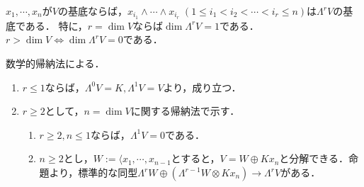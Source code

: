 \documentclass[uplatex,dvipdfmx]{jsreport}
\begin{document}
\begin{corollary}[外積代数の次元]\label{cor-basis-of-exterior-algebra}
    $x_1,\cdots,x_n$が$V$の基底ならば，$x_{i_1}\wedge\cdots\wedge x_{i_r}\;(1\le i_1<i_2<\cdots<i_r\le n)$は$\Lambda^rV$の基底である．
    特に，$r=\dim V$ならば$\dim\Lambda^rV=1$である．$r>\dim V\Leftrightarrow \dim\Lambda^rV=0$である．
\end{corollary}
\begin{Proof}
    数学的帰納法による．
    \begin{enumerate}
        \item $r\le 1$ならば，$\Lambda^0V=K,\Lambda^1V=V$より，成り立つ．
        \item $r\ge 2$として，$n=\dim V$に関する帰納法で示す．
        \begin{enumerate}[(1)]
            \item $r\ge 2,n\le 1$ならば，$\Lambda^1V=0$である．
            \item $n\ge 2$とし，$W:=\langle x_1,\cdots,x_{n-1}$とすると，$V=W\oplus Kx_n$と分解できる．命題より，標準的な同型$\Lambda^rW\oplus(\Lambda^{r-1}W\otimes Kx_n)\to\Lambda^rV$がある．
        \end{enumerate}
    \end{enumerate}
\end{Proof}
\end{document}
